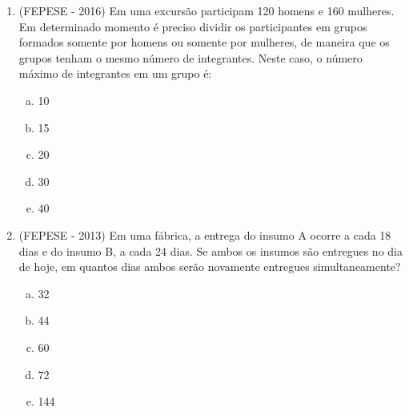 \begin{enumerate}
   \item (FEPESE - 2016) Em uma excursão participam 120 homens e 160 mulheres. Em determinado momento é preciso dividir os participantes em grupos formados somente por homens ou somente por mulheres, de maneira que os grupos tenham o mesmo número de integrantes. Neste caso, o número máximo de integrantes em um grupo é:
  \begin{enumerate}[a)]
  \item 10
  \item 15
  \item 20
  \item 30
  \item 40
  \end{enumerate}
  
  \item (FEPESE - 2013) Em uma fábrica, a entrega do insumo A ocorre a cada 18 dias e do insumo B, a cada 24 dias. Se ambos os insumos são entregues no dia de hoje, em quantos dias ambos serão novamente entregues simultaneamente?
  \begin{enumerate}[a)]
  \item 32
  \item 44
  \item 60
  \item 72
  \item 144
  \end{enumerate}
 \end{enumerate}

